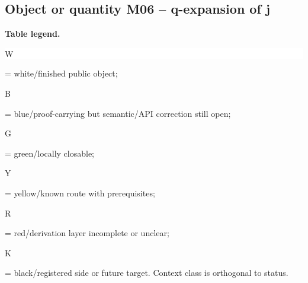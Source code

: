 \subsection*{Object or quantity M06 -- q-expansion of j}
\hypertarget{objproof:M06}{}
\par\smallskip\noindent\begin{minipage}{0.99\linewidth}\footnotesize\raggedright\textbf{Table legend.} \colorbox{white}{\strut W} = white/finished public object; \colorbox{cyan!20}{\strut B} = blue/proof-carrying but semantic/API correction still open; \colorbox{green!18}{\strut G} = green/locally closable; \colorbox{yellow!25}{\strut Y} = yellow/known route with prerequisites; \colorbox{red!20}{\strut R} = red/derivation layer incomplete or unclear; \colorbox{black!18}{\strut K} = black/registered side or future target. Context class is orthogonal to status.\end{minipage}\par\vspace{0.25em}

